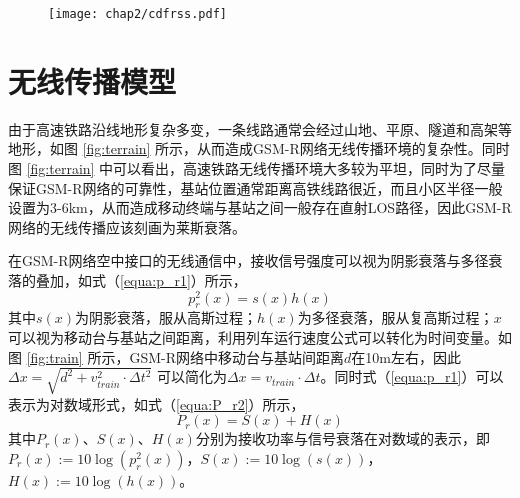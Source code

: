 \begin{figure}[!htp]
\centering
    \label{}
    \texttt{[image: chap2/cdfrss.pdf]}
\end{figure}


\section{无线传播模型}
\label{sec:channelmodel}

由于高速铁路沿线地形复杂多变，一条线路通常会经过山地、平原、隧道和高架等地形，如图 \ref{fig:terrain} 所示，从而造成GSM-R网络无线传播环境的复杂性。同时图 \ref{fig:terrain} 中可以看出，高速铁路无线传播环境大多较为平坦，同时为了尽量保证GSM-R网络的可靠性，基站位置通常距离高铁线路很近，而且小区半径一般设置为3-6km，从而造成移动终端与基站之间一般存在直射LOS路径，因此GSM-R网络的无线传播应该刻画为莱斯衰落。

\begin{figure}[!htp]
\centering
{}
    \hspace{1cm}
\hspace{1in}
\centering
{}
    \hspace{1cm}
\end{figure}

在GSM-R网络空中接口的无线通信中，接收信号强度可以视为阴影衰落与多径衰落的叠加，如式（\ref{equa:p_r1}）所示，
\begin{equation}
    p_{r}^{2}(x) = s(x)h(x)
\label{equa:p_r1}
\end{equation}
其中$s(x)$为阴影衰落，服从高斯过程；$h(x)$为多径衰落，服从复高斯过程；$x$可以视为移动台与基站之间距离，利用列车运行速度公式可以转化为时间变量。如图 \ref{fig:train} 所示，GSM-R网络中移动台与基站间距离$d$在10m左右，因此$\Delta x=\sqrt{d^2+v_{train}^2\cdot \Delta t^2}$ 可以简化为$\Delta x=v_{train}\cdot \Delta t$。同时式（\ref{equa:p_r1}）可以表示为对数域形式，如式（\ref{equa:P_r2}）所示，
\begin{equation}
P_{r}(x) = S(x) + H(x)
\label{equa:P_r2}
\end{equation}
其中$P_r(x)$、$S(x)$、$H(x)$分别为接收功率与信号衰落在对数域的表示，即$P_r(x):=10\log(p_{r}^{2}(x))$，$S(x):=10\log(s(x))$，$H(x):=10\log(h(x))$。


